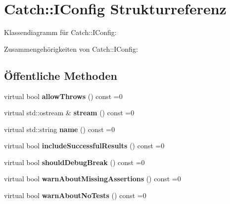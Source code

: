 \hypertarget{structCatch_1_1IConfig}{}\section{Catch\+:\+:I\+Config Strukturreferenz}
\label{structCatch_1_1IConfig}


Klassendiagramm für Catch\+:\+:I\+Config\+:


Zusammengehörigkeiten von Catch\+:\+:I\+Config\+:
\subsection*{Öffentliche Methoden}
\begin{DoxyCompactItemize}
\item 
\mbox{\label{structCatch_1_1IConfig_aadb95f849359de1e6eb915aab063e542}} 
virtual bool {\bfseries allow\+Throws} () const =0
\item 
\mbox{\label{structCatch_1_1IConfig_aa4c3fe0825e7e6ebdcfa6abc7abf3617}} 
virtual std\+::ostream \& {\bfseries stream} () const =0
\item 
\mbox{\label{structCatch_1_1IConfig_aa2315800a05c19db71518b1edc39d43b}} 
virtual std\+::string {\bfseries name} () const =0
\item 
\mbox{\label{structCatch_1_1IConfig_a2f1b0391019b9ce69921527a684eab23}} 
virtual bool {\bfseries include\+Successful\+Results} () const =0
\item 
\mbox{\label{structCatch_1_1IConfig_a5b886c5aad9001e90f63a7cf0726af63}} 
virtual bool {\bfseries should\+Debug\+Break} () const =0
\item 
\mbox{\label{structCatch_1_1IConfig_a75d970c495a28e46b8e9b04a1d32149f}} 
virtual bool {\bfseries warn\+About\+Missing\+Assertions} () const =0
\item 
\mbox{\label{structCatch_1_1IConfig_a30590623e3918825f2896c2262bf6fe3}} 
virtual bool {\bfseries warn\+About\+No\+Tests} () const =0
\item 
\mbox{\label{structCatch_1_1IConfig_a363f3388a439d02217f37198eff96744}} 

\end{DoxyCompactItemize}
